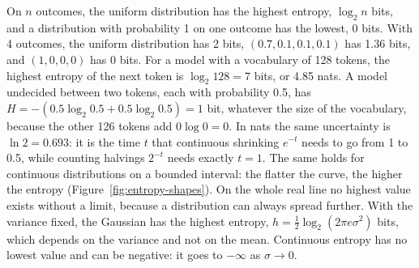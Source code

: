 On \(n\) outcomes, the uniform distribution has the highest entropy, \(\log_2 n\) bits, and a distribution with probability 1 on one outcome has the lowest, 0 bits.
With 4 outcomes, the uniform distribution has 2 bits, \((0.7,0.1,0.1,0.1)\) has 1.36 bits, and \((1,0,0,0)\) has 0 bits.
For a model with a vocabulary of 128 tokens, the highest entropy of the next token is \(\log_2 128=7\) bits, or 4.85 nats.
A model undecided between two tokens, each with probability 0.5, has \(H=-(0.5\log_2 0.5+0.5\log_2 0.5)=1\) bit, whatever the size of the vocabulary, because the other 126 tokens add \(0\log 0=0\).
In nats the same uncertainty is \(\ln 2=0.693\): it is the time \(t\) that continuous shrinking \(e^{-t}\) needs to go from 1 to 0.5, while counting halvings \(2^{-t}\) needs exactly \(t=1\).
The same holds for continuous distributions on a bounded interval: the flatter the curve, the higher the entropy (Figure~\ref{fig:entropy-shapes}).
On the whole real line no highest value exists without a limit, because a distribution can always spread further.
With the variance fixed, the Gaussian has the highest entropy, \(h=\tfrac12\log_2(2\pi e\sigma^2)\) bits, which depends on the variance and not on the mean.
Continuous entropy has no lowest value and can be negative: it goes to \(-\infty\) as \(\sigma\to 0\).
\providecommand{\captionof}[1]{\expandafter\def\csname @captype\endcsname{#1}\caption}
